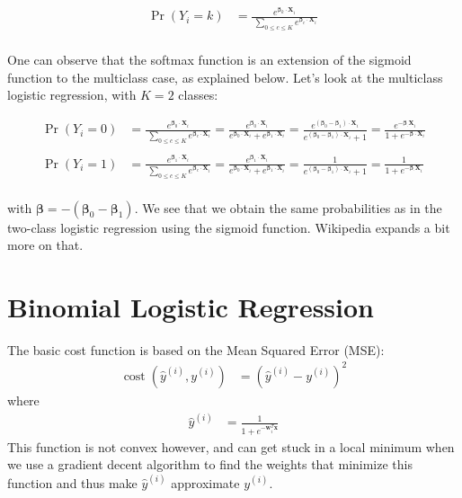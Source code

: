 \documentclass[a4paper]{article}
\begin{document}
\begin{align} \Pr(Y_i=k) &= \frac{e^{\boldsymbol\beta_k \cdot \mathbf{X}_i}} {~\sum_{0 \leq c \leq K}^{}{e^{\boldsymbol\beta_c \cdot \mathbf{X}_i}}} \, \\ \end{align}

One can observe that the softmax function is an extension of the sigmoid function to the multiclass case, as explained below. Let's look at the multiclass logistic regression, with $K=2$ classes:

\begin{align} \Pr(Y_i=0) &= \frac{e^{\boldsymbol\beta_0 \cdot \mathbf{X}_i}} {~\sum_{0 \leq c \leq K}^{}{e^{\boldsymbol\beta_c \cdot \mathbf{X}_i}}} = \frac{e^{\boldsymbol\beta_0 \cdot \mathbf{X}_i}}{e^{\boldsymbol\beta_0 \cdot \mathbf{X}_i} + e^{\boldsymbol\beta_1 \cdot \mathbf{X}_i}} = \frac{e^{(\boldsymbol\beta_0 - \boldsymbol\beta_1) \cdot \mathbf{X}_i}}{e^{(\boldsymbol\beta_0 - \boldsymbol\beta_1) \cdot \mathbf{X}_i} + 1} = \frac{e^{-\boldsymbol\beta_ \cdot \mathbf{X}_i}} {1 +e^{-\boldsymbol\beta \cdot \mathbf{X}_i}} \\ \, \\ \Pr(Y_i=1) &= \frac{e^{\boldsymbol\beta_1 \cdot \mathbf{X}_i}} {~\sum_{0 \leq c \leq K}^{}{e^{\boldsymbol\beta_c \cdot \mathbf{X}_i}}} = \frac{e^{\boldsymbol\beta_1 \cdot \mathbf{X}_i}}{e^{\boldsymbol\beta_0 \cdot \mathbf{X}_i} + e^{\boldsymbol\beta_1 \cdot \mathbf{X}_i}} = \frac{1}{e^{(\boldsymbol\beta_0-\boldsymbol\beta_1) \cdot \mathbf{X}_i} + 1} = \frac{1} {1 +e^{-\boldsymbol\beta_ \cdot \mathbf{X}_i}} \, \\ \end{align}

with $\boldsymbol\beta = - (\boldsymbol\beta_0 - \boldsymbol\beta_1)$. We see that we obtain the same probabilities as in the two-class logistic regression using the sigmoid function. Wikipedia expands a bit more on that.


\section{Binomial Logistic Regression}

The basic cost function is based on the Mean Squared Error (MSE):
\begin{align}
\operatorname{cost}(\hat{y}^{(i)},y^{(i)}) &= (\hat{y}^{(i)} - y^{(i)})^2
\end{align}
where
\begin{align}
\hat{y}^{(i)} &= \frac{1}{1 + e^{-\mathbf{w}^T_i\mathbf{x}}}
\end{align}
This function is not convex however, and can get stuck in a local minimum when we use a gradient decent algorithm to find the weights that minimize this function and thus make $\hat{y}^{(i)}$ approximate $y^{(i)}$.
\end{document}
